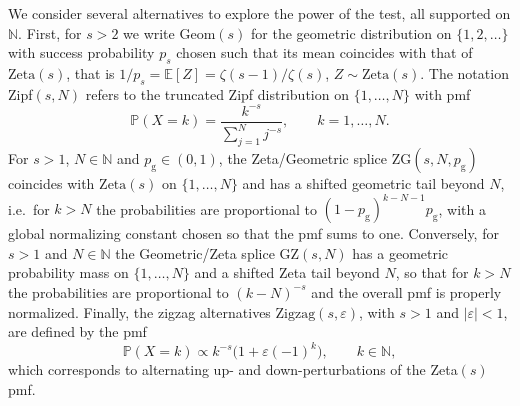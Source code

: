 \documentclass{article}
\theoremstyle{thm}
\theoremstyle{def}
\newcommand{\E}{\mathbb{E}} %
\begin{document}
We consider several alternatives to explore the power of the test, all supported on
$\mathbb{N}$.  First, for $s>2$ we write
$\mathrm{Geom}(s)$ for the geometric distribution on $\{1,2,\dots\}$ with success
probability $p_s$ chosen such that its mean coincides with that of $\mathrm{Zeta}(s)$,
that is $1/p_s = \E[Z] = \zeta(s-1)/\zeta(s)$, $Z\sim\mathrm{Zeta}(s)$.  The notation Zipf$(s,N)$ refers to the
truncated Zipf distribution on $\{1,\dots,N\}$ with pmf
\[
  \mathbb{P}(X=k) = \frac{k^{-s}}{\sum_{j=1}^N j^{-s}}, \qquad k=1,\dots,N.
\]
For $s>1$, $N\in\mathbb{N}$ and
$p_{\mathrm{g}}\in(0,1)$, the Zeta/Geometric splice $\mathrm{ZG}(s,N,p_{\mathrm{g}})$
coincides with $\mathrm{Zeta}(s)$ on $\{1,\dots,N\}$ and has a shifted geometric tail
beyond $N$, i.e.\ for $k>N$ the probabilities are proportional to
$(1-p_{\mathrm{g}})^{k-N-1}p_{\mathrm{g}}$, with a global normalizing constant chosen
so that the pmf sums to one.  Conversely, for $s>1$ and $N\in\mathbb{N}$ the
Geometric/Zeta splice $\mathrm{GZ}(s,N)$ has a geometric probability mass on $\{1,\dots,N\}$ and a
shifted Zeta tail beyond $N$, so that for $k>N$ the probabilities are proportional to
$(k-N)^{-s}$ and the overall pmf is properly normalized.  Finally, the zigzag
alternatives $\mathrm{Zigzag}(s,\varepsilon)$, with $s>1$ and $|\varepsilon|<1$, are
defined by the pmf
\[
  \mathbb{P}(X=k) \propto k^{-s}\bigl(1+\varepsilon(-1)^k\bigr), \qquad k\in\mathbb{N},
\]
which corresponds to alternating up- and down-perturbations of the Zeta$(s)$ pmf.
\end{document}
